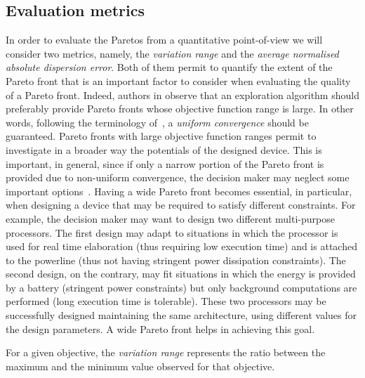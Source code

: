 
\subsection{Evaluation metrics}
In order to evaluate the Paretos from a quantitative point-of-view we
will consider two metrics, namely, the \emph{variation range} and the
\emph{average normalised absolute dispersion error}. Both of them permit to quantify the extent of the Pareto front that is an important factor to consider when evaluating the quality of a Pareto front. Indeed, authors in \cite{zitzler_ec00,weise2012evolutionary} observe that an exploration algorithm should preferably provide Pareto fronts whose objective function range is large. In other words, following the terminology of~\cite{weise2012evolutionary}, a \emph{uniform convergence} should be guaranteed.
Pareto fronts with large objective function ranges permit to investigate in a broader way the potentials of the designed device. This is important, in general, since if only a narrow portion of the Pareto front is provided due to non-uniform convergence, the decision maker may neglect some important options~\cite{weise2012evolutionary}. Having a wide Pareto front becomes essential, in particular, when designing a device that may be required to satisfy different constraints. For example, the decision maker may want to design two different multi-purpose processors. The first design may adapt to situations in which the processor is used for real time elaboration (thus requiring low execution time) and is attached to the powerline (thus not having stringent power dissipation constraints). The second design, on the contrary, may fit situations in which the energy is provided by a battery (stringent power constraints) but only background computations are performed (long execution time is tolerable). These two processors may be successfully designed maintaining the same architecture, using different values for the design parameters. A wide Pareto front helps in achieving this goal.

For a given objective, the \emph{variation range} represents the ratio between the maximum and the minimum value observed for that objective.


